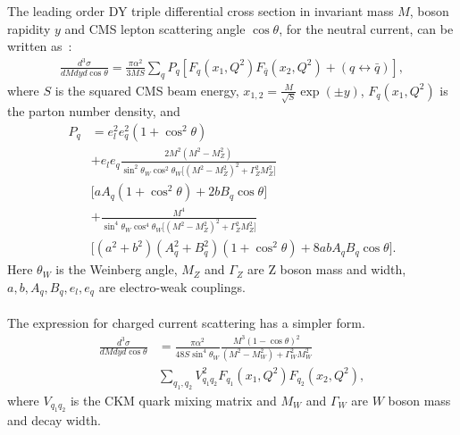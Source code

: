 \begin{description}
\begin{itemize}
The leading order DY triple differential cross section in
invariant mass \(M\), boson rapidity \(y\) and CMS
lepton scattering angle \(\cos\theta\), for the neutral current, 
can be written as~\cite{Drell:1970wh,Yamada:1981mw}:
\begin{align}
 \textstyle
 \frac{d^3\sigma}{dM{d}y d\cos\theta} =  
 \frac{\pi\alpha^2}{3MS}\sum_{q}P_q \left[F_q(x_1,Q^2)F_{\bar{q}}(x_2,Q^2) 
 + (q\leftrightarrow\bar{q})\right],
\end{align}
where \(S\) is the squared CMS beam energy, \(x_{1,2} = \frac{M}{\sqrt{S}}\exp(\pm y)\), $F_q(x_1,Q^2)$ 
is the parton number density, and 
\begin{align}
  P_q &=  e_l^2e_q^2(1+\cos^2\theta) \nonumber \\
      &+  e_le_q\frac{2M^2(M^2-M_Z^2)}{\sin^2\theta_W\cos^2\theta_W
          \big[(M^2-M_Z^2)^2+\Gamma_Z^2M_Z^2\big]} \nonumber \\
      &    \big[aA_q(1+\cos^2\theta)+2bB_q\cos\theta\big] \nonumber \\
      &+  \frac{M^4}{\sin^4\theta_W\cos^4\theta_W
          \big[(M^2-M_Z^2)^2+\Gamma_Z^2M_Z^2\big]} \nonumber \\
      &    \big[(a^2+b^2)(A_q^2+B_q^2)(1+\cos^2\theta)+8abA_qB_q\cos\theta\big].
\end{align}
Here \(\theta_W\) is the Weinberg angle, \(M_Z\) and \(\Gamma_Z\) are Z boson mass and 
width, $a, b, A_q, B_q, e_l, e_q$ are electro-weak couplings.
\\
\\
The expression for charged current scattering has a simpler form.
\begin{align}
\frac{d^3\sigma}{dMdyd\cos\theta} &=
 \frac{\pi\alpha^2}{48S\sin^4\theta_W}
 \frac{M^3(1-\cos\theta)^2}{(M^2-M_W^2)+\Gamma_W^2M_W^2}  \nonumber \\
 & \sum_{q_1,q_2}V_{q_1q_2}^2F_{q_1}(x_1,Q^2)F_{q_2}(x_2,Q^2),
\end{align}
where \(V_{q_1q_2}\) is the CKM quark mixing matrix and \(M_W\) and \(\Gamma_W\)
are \(W\) boson mass and decay width.


\end{itemize}
\end{description}
